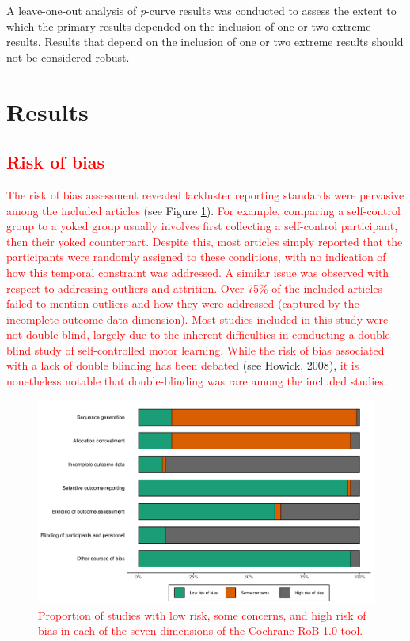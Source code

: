 \documentclass[
  english,
  man,floatsintext]{apa7}
\begin{document}
A leave-one-out analysis of \emph{p}-curve results was conducted to assess the extent to which the primary results depended on the inclusion of one or two extreme results. Results that depend on the inclusion of one or two extreme results should not be considered robust.

\hypertarget{results}{%
\section{Results}\label{results}}

\hypertarget{section-1}{%
\subsection{\texorpdfstring{\textcolor{red}{Risk of bias}}{}}\label{section-1}}

\textcolor{red}{The risk of bias assessment revealed lackluster reporting standards were pervasive among the included articles} (see Figure \ref{fig:fig2}). \textcolor{red}{For example, comparing a self-control group to a yoked group usually involves first collecting a self-control participant, then their yoked counterpart. Despite this, most articles simply reported that the participants were randomly assigned to these conditions, with no indication of how this temporal constraint was addressed. A similar issue was observed with respect to addressing outliers and attrition. Over 75\% of the included articles failed to mention outliers and how they were addressed (captured by the incomplete outcome data dimension). Most studies included in this study were not double-blind, largely due to the inherent difficulties in conducting a double-blind study of self-controlled motor learning. While the risk of bias associated with a lack of double blinding has been debated} (see Howick, 2008), \textcolor{red}{it is nonetheless notable that double-blinding was rare among the included studies.}



\begin{figure}

{\centering \includegraphics[height=0.81\textheight]{../../figs/fig2} 

}

\caption{\textcolor{red}{Proportion of studies with low risk, some concerns, and high risk of bias in each of the seven dimensions of the Cochrane RoB 1.0 tool.}}\label{fig:fig2}
\end{figure}
\end{document}
